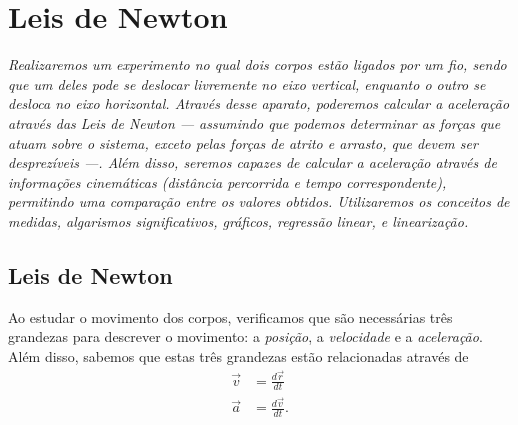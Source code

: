 \chapter{Leis de Newton}
\label{Chap:ExpLeisDeNewton}

\begin{fullwidth}\it
	Realizaremos um experimento no qual dois corpos estão ligados por um fio, sendo que um deles pode se deslocar livremente no eixo vertical, enquanto o outro se desloca no eixo horizontal. Através desse aparato, poderemos calcular a aceleração através das Leis de Newton --- assumindo que podemos determinar as forças que atuam sobre o sistema, exceto pelas forças de atrito e arrasto, que devem ser desprezíveis ---. Além disso, seremos capazes de calcular a aceleração através de informações cinemáticas (distância percorrida e tempo correspondente), permitindo uma comparação entre os valores obtidos. Utilizaremos os conceitos de medidas, algarismos significativos, gráficos, regressão linear, e linearização.
\end{fullwidth}

\section{Leis de Newton}

Ao estudar o movimento dos corpos, verificamos que são necessárias três grandezas para descrever o movimento: a \emph{posição}, a \emph{velocidade} e a \emph{aceleração}. Além disso, sabemos que estas três grandezas estão relacionadas através de
\begin{align}
	\vec{v} &= \frac{d\vec{r}}{dt} \\
	\vec{a} &= \frac{d\vec{v}}{dt}.
\end{align}


